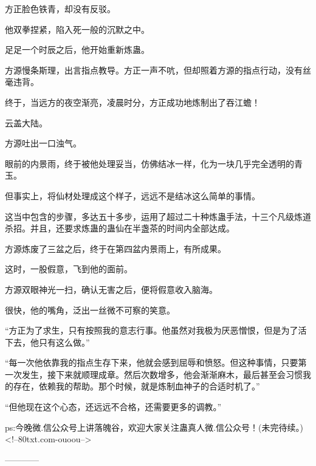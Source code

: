 \begin{this_body}
方正脸色铁青，却没有反驳。

他双拳捏紧，陷入死一般的沉默之中。

足足一个时辰之后，他开始重新炼蛊。

方源慢条斯理，出言指点教导。方正一声不吭，但却照着方源的指点行动，没有丝毫违背。

终于，当远方的夜空渐亮，凌晨时分，方正成功地炼制出了吞江蟾！

云盖大陆。

方源吐出一口浊气。

眼前的内景雨，终于被他处理妥当，仿佛结冰一样，化为一块几乎完全透明的青玉。

但事实上，将仙材处理成这个样子，远远不是结冰这么简单的事情。

这当中包含的步骤，多达五十多步，运用了超过二十种炼蛊手法，十三个凡级炼道杀招。并且，还要求炼蛊的蛊仙在半盏茶的时间内全部达成。

方源炼废了三盆之后，终于在第四盆内景雨上，有所成果。

这时，一股假意，飞到他的面前。

方源双眼神光一扫，确认无害之后，便将假意收入脑海。

很快，他的嘴角，泛出一丝微不可察的笑意。

“方正为了求生，只有按照我的意志行事。他虽然对我极为厌恶憎恨，但是为了活下去，他只有这么做。”

“每一次他依靠我的指点生存下来，他就会感到屈辱和愤怒。但这种事情，只要第一次发生，接下来就顺理成章。然后次数增多，他会渐渐麻木，最后甚至会习惯我的存在，依赖我的帮助。那个时候，就是炼制血神子的合适时机了。”

“但他现在这个心态，还远远不合格，还需要更多的调教。”

ps:今晚微.信公众号上讲落魄谷，欢迎大家关注蛊真人微.信公众号！(未完待续。)<!--80txt.com-ouoou-->

------------

\end{this_body}


